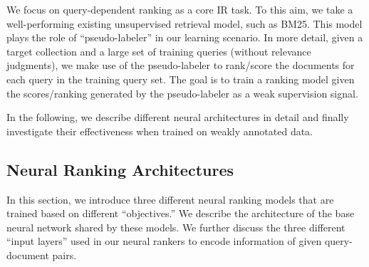 We focus on query-dependent ranking as a core IR task. To this aim, we take a well-performing existing unsupervised retrieval model, such as BM25. This model plays the role of ``pseudo-labeler'' in our learning scenario. In more detail, given a target collection and a large set of training queries (without relevance judgments), we make use of the pseudo-labeler to rank/score the documents for each query in the training query set. The goal is to train a ranking model given the scores/ranking generated by the pseudo-labeler as a weak supervision signal.

In the following, we describe different neural architectures in detail and finally investigate their effectiveness when trained on weakly annotated data.  

\subsection{Neural Ranking Architectures}
\label{sec:neural_ranking_arch}
In this section, we introduce three different neural ranking models that are trained based on different ``objectives.'' We describe the architecture of the base neural network shared by these models. We further discuss the three different ``input layers'' used in our neural rankers to encode information of given query-document pairs.
\medskip

